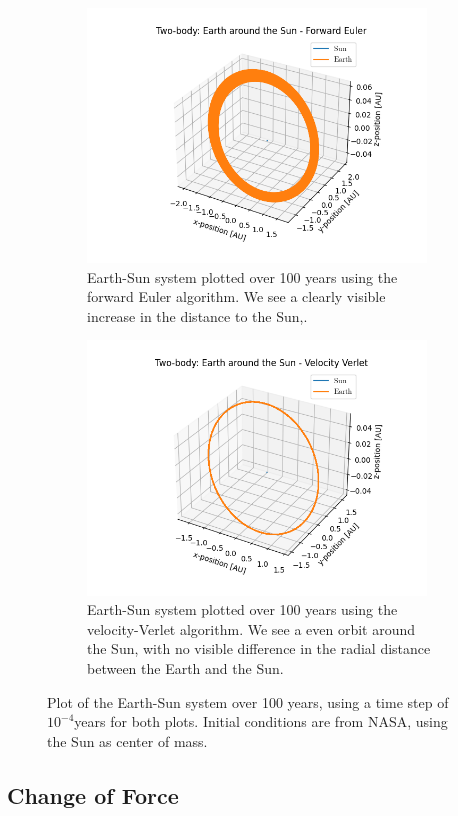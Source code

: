 \documentclass[%
reprint,
nofootinbib,
amsmath,amssymb,
aps,
]{revtex4-1}
\begin{document}
\begin{figure}[t]
	\centering
	\begin{subfigure}{9cm}
			\centering
		\includegraphics[width=9cm]{../code/classes/figure/ESFE.png} 
		\caption{Earth-Sun system plotted over 100 years using the forward Euler algorithm. We see a clearly visible increase in the distance to the Sun,.}
		\label{fig:FE}
	\end{subfigure}%
	\begin{subfigure}{9cm}
			\centering
		\includegraphics[width=9cm]{../code/classes/figure/ESVV.png}
		\caption{Earth-Sun system plotted over 100 years using the velocity-Verlet algorithm. We see a even orbit around the Sun, with no visible difference in the radial distance between the Earth and the Sun.}
		\label{fig:VV}
	\end{subfigure}
	\caption{Plot of the Earth-Sun system over 100 years, using a time step of $10^{-4}$years for both plots. Initial conditions are from NASA, using the Sun as center of mass.}
	\label{fig:2B}
\end{figure}
\subsection{Change of Force}%
\end{document}
